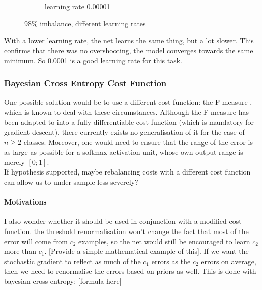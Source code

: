 \documentclass[a4paper,11pt]{article}
\begin{document}
\begin{figure}
\begin{minipage}[b]{\textwidth}
\begin{subfigure}{.5\textwidth}
        \caption{learning rate 0.00001}\label{fig:2b}
      \end{subfigure} \par \vspace*{20pt} %
      \caption{98\% imbalance, different learning rates}\label{fig:2}
    \end{minipage}%
\end{figure}

With a lower learning rate, the net learns the same thing, but a lot slower. This confirms that there was no overshooting, the model converges towards the same minimum. So 0.0001 is a good learning rate for this task. \\


\subsubsection{Bayesian Cross Entropy Cost Function}

One possible solution would be to use a different cost function: the F-measure \cite{f-measure}, which is known to deal with these circumstances. Although the F-measure has been adapted to into a fully differentiable cost function (which is mandatory for gradient descent), there currently exists no generalisation of it for the case of $n \ge 2$
classes. Moreover, one would need to ensure that the range of the error is as large as possible for a softmax activation unit, whose own output range is merely $[0;1]$. \\ 

If hypothesis supported, maybe rebalancing costs with a different cost function can allow us to under-sample less severely? \\


\paragraph{Motivations}

I also wonder whether it should be used in conjunction with a modified cost function. the threshold renormalisation won't change the fact that most of the error will come from $c_2$ examples, so the net would still be encouraged to learn $c_2$ more than $c_1$. [Provide a simple mathematical example of this]. If we want the stochastic gradient to reflect as much of the $c_1$ errors as the $c_2$ errors on average, then we need to renormalise the errors based on priors as well. This is done with bayesian cross entropy: [formula here] \\
\end{document}
